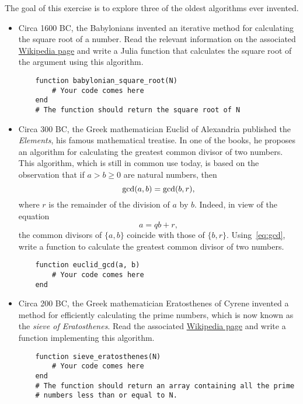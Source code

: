 \begin{task}
    The goal of this exercise is to explore three of the oldest algorithms ever invented.
    \begin{itemize}
        \item
            Circa 1600 BC, the Babylonians invented an iterative method for calculating the square root of a number.
            Read the relevant information on the associated \href{https://en.wikipedia.org/wiki/Methods_of_computing_square_roots#Babylonian_method}{Wikipedia page} and write a Julia function that
            calculates the square root of the argument using this algorithm.
    \begin{verbatim}
    function babylonian_square_root(N)
        # Your code comes here
    end
    # The function should return the square root of N
    \end{verbatim}

        \item Circa 300 BC,
            the Greek mathematician Euclid of Alexandria published the \emph{Elements},
            his famous mathematical treatise.
            In one of the books,
            he proposes an algorithm for calculating the greatest common divisor of two numbers.
            This algorithm,
            which is still in common use today,
            is based on the observation that if $a > b \geq 0$ are natural numbers,
            then
            \begin{equation}
                \label{eq:gcd}
                {\rm gcd} (a, b) = {\rm gcd}(b, r),
            \end{equation}
            where $r$ is the remainder of the division of $a$ by $b$.
            Indeed, in view of the equation
            \[
                a = q b + r,
            \]
            the common divisors of $\{a,b\}$ coincide with those of $\{b, r\}$.
            Using~\eqref{eq:gcd},
            write a function to calculate the greatest common divisor of two numbers.
    \begin{verbatim}
    function euclid_gcd(a, b)
        # Your code comes here
    end
    \end{verbatim}

        \item Circa 200 BC,
            the Greek mathematician Eratosthenes of Cyrene invented a method for efficiently calculating the prime numbers,
            which is now known as the \emph{sieve of Eratosthenes}.
            Read the associated \href{https://en.wikipedia.org/wiki/Sieve_of_Eratosthenes}{Wikipedia page}
            and write a function implementing this algorithm.
    \begin{verbatim}
    function sieve_eratosthenes(N)
        # Your code comes here
    end
    # The function should return an array containing all the prime
    # numbers less than or equal to N.
    \end{verbatim}
    \end{itemize}
\end{task}

